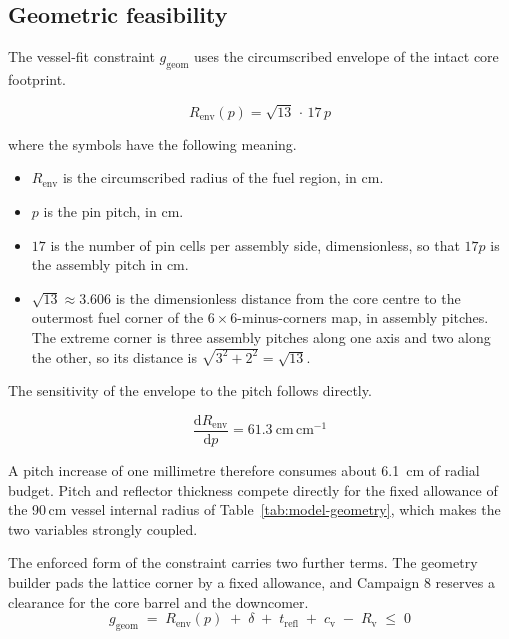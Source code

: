 \subsection{Geometric feasibility}
\label{sec:meth-geom}

The vessel-fit constraint $g_\mathrm{geom}$ uses the circumscribed
envelope of the intact core footprint.

\begin{equation}
R_\mathrm{env}(p) = \sqrt{13}\,\cdot\,17\,p
\label{eq:renv}
\end{equation}

\noindent where the symbols have the following meaning.

\begin{itemize}
  \item $R_\mathrm{env}$ is the circumscribed radius of the fuel
        region, in cm.

  \item $p$ is the pin pitch, in cm.

  \item $17$ is the number of pin cells per assembly side,
        dimensionless, so that $17p$ is the assembly pitch in cm.

  \item $\sqrt{13} \approx 3.606$ is the dimensionless distance from
        the core centre to the outermost fuel corner of the
        $6\times6$-minus-corners map, in assembly pitches. The extreme
        corner is three assembly pitches along one axis and two along
        the other, so its distance is $\sqrt{3^2 + 2^2} = \sqrt{13}$.
\end{itemize}

The sensitivity of the envelope to the pitch follows directly.

\begin{equation}
\frac{\mathrm{d}R_\mathrm{env}}{\mathrm{d}p} = 61.3~\mathrm{cm\,cm^{-1}}
\label{eq:drenv}
\end{equation}

A pitch increase of one millimetre therefore consumes about
\SI{6.1}{cm} of radial budget. Pitch and reflector thickness compete
directly for the fixed allowance of the 90\,cm vessel internal radius
of Table~\ref{tab:model-geometry}, which makes the two variables
strongly coupled.

The enforced form of the constraint carries two further terms. The
geometry builder pads the lattice corner by a fixed allowance, and
Campaign 8 reserves a clearance for the core barrel and the downcomer.
\begin{equation}
g_\mathrm{geom} \;=\; R_\mathrm{env}(p) \;+\; \delta \;+\;
t_\mathrm{refl} \;+\; c_\mathrm{v} \;-\; R_\mathrm{v} \;\le\; 0
\label{eq:ggeom}
\end{equation}

